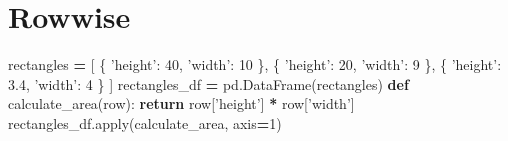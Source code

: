 \documentclass[]{book}
\newenvironment{Shaded}{\begin{snugshade}}{\end{snugshade}}
\newcommand{\KeywordTok}[1]{\textcolor[rgb]{0.13,0.29,0.53}{\textbf{#1}}}
\newcommand{\DataTypeTok}[1]{\textcolor[rgb]{0.13,0.29,0.53}{#1}}
\newcommand{\DecValTok}[1]{\textcolor[rgb]{0.00,0.00,0.81}{#1}}
\newcommand{\FloatTok}[1]{\textcolor[rgb]{0.00,0.00,0.81}{#1}}
\newcommand{\StringTok}[1]{\textcolor[rgb]{0.31,0.60,0.02}{#1}}
\newcommand{\ControlFlowTok}[1]{\textcolor[rgb]{0.13,0.29,0.53}{\textbf{#1}}}
\newcommand{\OperatorTok}[1]{\textcolor[rgb]{0.81,0.36,0.00}{\textbf{#1}}}
\newcommand{\BuiltInTok}[1]{#1}
\newcommand{\NormalTok}[1]{#1}
\begin{document}
\section{Rowwise}\label{rowwise}

\begin{Shaded}
\begin{Highlighting}[]
\NormalTok{rectangles }\OperatorTok{=}\NormalTok{ [}
\NormalTok{    \{ }\StringTok{'height'}\NormalTok{: }\DecValTok{40}\NormalTok{, }\StringTok{'width'}\NormalTok{: }\DecValTok{10}\NormalTok{ \},}
\NormalTok{    \{ }\StringTok{'height'}\NormalTok{: }\DecValTok{20}\NormalTok{, }\StringTok{'width'}\NormalTok{: }\DecValTok{9}\NormalTok{ \},}
\NormalTok{    \{ }\StringTok{'height'}\NormalTok{: }\FloatTok{3.4}\NormalTok{, }\StringTok{'width'}\NormalTok{: }\DecValTok{4}\NormalTok{ \}}
\NormalTok{]}
\NormalTok{rectangles_df }\OperatorTok{=}\NormalTok{ pd.DataFrame(rectangles)}
\KeywordTok{def}\NormalTok{ calculate_area(row):}
    \ControlFlowTok{return}\NormalTok{ row[}\StringTok{'height'}\NormalTok{] }\OperatorTok{*}\NormalTok{ row[}\StringTok{'width'}\NormalTok{]}
\NormalTok{rectangles_df.}\BuiltInTok{apply}\NormalTok{(calculate_area, axis}\OperatorTok{=}\DecValTok{1}\NormalTok{)}
\end{Highlighting}
\end{Shaded}

\begin{Shaded}
\end{Shaded}
\end{document}
